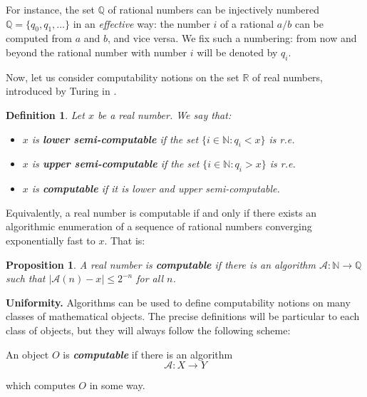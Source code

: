 \documentclass[copyright,creativecommons]{eptcs}
\newtheorem{definition}{Definition}
\newtheorem{proposition}{Proposition}
\numberwithin{equation}{section}
\begin{document}
For instance, the set $\mathbb{Q}$ of rational numbers can be injectively
numbered $\mathbb{Q}=\{q_0,q_1,\ldots\}$ in an \emph{effective} way: the
number $i$ of a rational $a/b$ can be computed from $a$ and $b$, and vice
versa. We fix such a numbering: from now and beyond the rational number with
number $i$ will be denoted by $q_i$.

Now, let us consider computability notions on the set $\mathbb{R}$ of real
numbers, introduced by Turing in \cite{Tur36}.

\begin{definition}
Let $x$ be a real number. We say that:

\begin{itemize}
\item $x$ is \textbf{\emph{lower semi-computable}} if the set $\{i\in
\mathbb{N}:q_i<x\}$ is r.e.

\item $x$ is \textbf{\emph{upper semi-computable}} if the set $\{i\in
\mathbb{N}:q_i>x\}$ is r.e.

\item $x$ is \textbf{\emph{computable}} if it is lower and upper
semi-computable.
\end{itemize}
\end{definition}

Equivalently, a real number is computable if and only if there exists an
algorithmic enumeration of a sequence of rational numbers converging
exponentially fast to $x$. That is:

\begin{proposition}
A real number is \textbf{\emph{computable}} if there is an algorithm $\mathcal{A}:\mathbb{N}\to \mathbb{Q}$ such that $|\mathcal{A}(n)-x|\leq
2^{-n}$ for all $n$.
\end{proposition}

\medskip

\noindent \textbf{Uniformity.} Algorithms can be used to define
computability notions on many classes of mathematical objects. The precise
definitions will be particular to each class of objects, but they will
always follow the following scheme:


\smallskip

\begin{center}
An object $O$ is \textbf{\emph{computable}} if there is an algorithm
\begin{equation*}
\mathcal{A}:X\to Y
\end{equation*}

which computes $O$ in some way.
\end{center}
\end{document}
